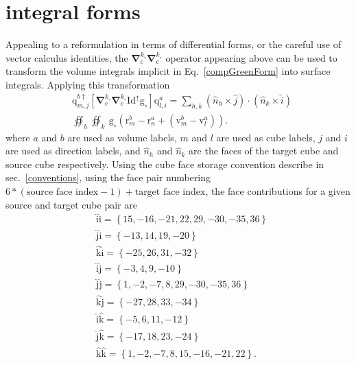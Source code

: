 \documentclass[reprint,aps,prb]{revtex4-2}
\newcommand{\bmm}[1]{\bm{\mathrm{#1}}}
\begin{document}
\section{integral forms}
\noindent
Appealing to a reformulation in terms of differential forms, or the careful use of vector calculus identities, the $\bm{\nabla}^{k_{\circ}}_{\bmm{c}}\bm{\nabla}^{k_{\circ}}_{\bmm{c}}$ operator appearing above can be used to transform the volume integrals implicit in Eq.~\eqref{compGreenForm} into surface integrals. 
Applying this transformation
\begin{align}
	&\bmm{q}_{m, j}^{b\dagger} \left[\bm{\nabla}_{\bmm{c}}^{k_{\circ}}\bm{\nabla}_{\bmm{c}}^{k_{\circ}}  
	\bmm{Id}^{\uparrow} \bmm{g}_{\circ}\right]\bmm{q}_{l,i}^{a} = \sum_{h,k} \left(\hat{n}_{h}\times \hat{j}\right)\cdot\left(\hat{n}_{k}\times\hat{i}\right)
	\nonumber
	\\
	&\oiint_{h}\oiint_{k}~\text{g}_{\circ}\left(\bmm{r}_{m}^{b}-\bmm{r}_{n}^{a}+\left(\bmm{v}^{b}_{m}-\bmm{v}^{a}_{l}\right)\right).
	\label{surfaceInts}
\end{align}
where $a$ and $b$ are used as volume labels, $m$ and $l$ are used as cube labels, $j$ and $i$ are used as direction labels, and $\hat{n}_{h}$ and $\hat{n}_{k}$ are the faces of the target cube and source cube respectively. 
Using the cube face storage convention describe in sec.~\ref{conventions}, using the face pair numbering $6*\left(\text{source face index} - 1\right) + \text{target face index}$, the face contributions for a given source and target cube pair are 
\begin{align}
	&\hat{\bmm{i}}\hat{\bmm{i}} = \left\{15,-16,-21,22,29,-30,-35,36\right\}
	\nonumber \\
	&\hat{\bmm{j}}\hat{\bmm{i}} = \left\{-13,14,19,-20\right\}
	\nonumber \\
	&\hat{\bmm{k}}\hat{\bmm{i}} = \left\{-25,26,31,-32\right\}
	\nonumber \\
	&\hat{\bmm{i}}\hat{\bmm{j}} = \left\{-3,4,9,-10\right\}
	\nonumber \\
	&\hat{\bmm{j}}\hat{\bmm{j}} = \left\{1,-2,-7,8,29,-30,-35,36\right\}
	\nonumber \\
	&\hat{\bmm{k}}\hat{\bmm{j}} = \left\{-27,28,33,-34\right\}
	\nonumber \\
	&\hat{\bmm{i}}\hat{\bmm{k}} = \left\{-5,6,11,-12\right\}
	\nonumber \\
	&\hat{\bmm{j}}\hat{\bmm{k}} = \left\{-17,18,23,-24\right\}
	\nonumber \\
	&\hat{\bmm{k}}\hat{\bmm{k}} = \left\{1,-2,-7,8,15,-16,-21,22\right\}.
\end{align}
\end{document}
